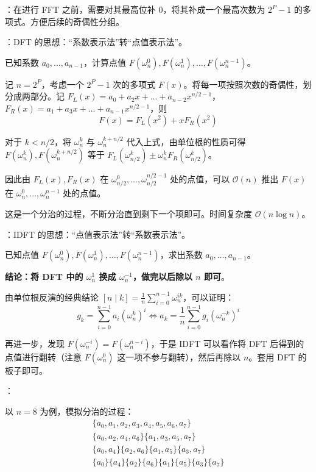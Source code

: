 ：在进行 FFT 之前，需要对其最高位补 $0$，将其补成一个最高次数为 $2^P - 1$ 的多项式。方便后续的奇偶性分组。

：DFT 的思想：“系数表示法”转“点值表示法”。

已知系数 $a_0, \dots, a_{n - 1}$，计算点值 $F(\omega_n^0), F(\omega_n^1), \dots, F(\omega_n^{n - 1})$。

记 $n = 2^P$，考虑一个 $2^P - 1$ 次的多项式 $F(x)$。将每一项按照次数的奇偶性，划分成两部分。记 $F_L(x) = a_0 + a_2x + \dots + a_{n - 2}x^{n / 2 - 1}$，$F_R(x) = a_1 + a_3x + \dots + a_{n - 1}x^{n / 2 - 1}$，则
\[
F(x) = F_L(x^2) + xF_R(x^2)
\]

对于 $k < n / 2$，将 $\omega_n^k$ 与 $\omega_n^{k + n / 2}$ 代入上式，由单位根的性质可得 $F(\omega_n^k), F(\omega_n^{k + n / 2})$ 等于 $F_L(\omega_{n / 2}^k)\pm\omega_n^kF_R(\omega_{n / 2}^k)$。

因此由 $F_L(x), F_R(x)$ 在 $\omega_{n / 2}^0, \dots, \omega_{n / 2}^{n / 2 - 1}$ 处的点值，可以 $\mathcal{O}(n)$ 推出 $F(x)$ 在 $\omega_n^0, \dots, \omega_n^{n - 1}$ 处的点值。

这是一个分治的过程，不断分治直到剩下一个项即可。时间复杂度 $\mathcal{O}(n \log n)$。

：IDFT 的思想：“点值表示法”转“系数表示法”。

已知点值 $F(\omega_n^0), F(\omega_n^1), \dots, F(\omega_n^{n - 1})$，求出系数 $a_0, \dots, a_{n - 1}$。

\textbf{结论：将 DFT 中的 $\omega_n^1$ 换成 $\omega_n^{-1}$，做完以后除以 $n$ 即可}。

由单位根反演的经典结论 $[n \mid k] = \frac{1}{n}\sum_{i = 0}^{n - 1}\omega_{n}^{ik}$，可以证明：
\[
g_k = \sum\limits_{i = 0}^{n - 1}a_i \left( \omega_n^k \right)^i \iff a_k = \frac{1}{n} \sum\limits_{i = 0}^{n - 1}g_i \left( \omega_n^{-k} \right)^i
\]

再进一步，发现 $F(\omega_n^{-i}) = F(\omega_n^{n - i})$，于是 IDFT 可以看作将 DFT 后得到的点值进行翻转（注意 $F(\omega_n^0)$ 这一项不参与翻转），然后再除以 $n$。套用 DFT 的板子即可。

：

以 $n = 8$ 为例，模拟分治的过程：
\[
\begin{gathered}
\{ a_0, a_1, a_2, a_3, a_4, a_5, a_6, a_7 \} \\
\{ a_0, a_2, a_4, a_6 \}\{ a_1, a_3, a_5, a_7 \} \\
\{ a_0, a_4 \} \{ a_2, a_6 \} \{ a_1, a_5 \} \{ a_3, a_7 \} \\
\{ a_0 \} \{ a_4 \} \{ a_2 \} \{ a_6 \} \{ a_1 \} \{ a_5 \} \{ a_3 \} \{ a_7 \}
\end{gathered}
\]

